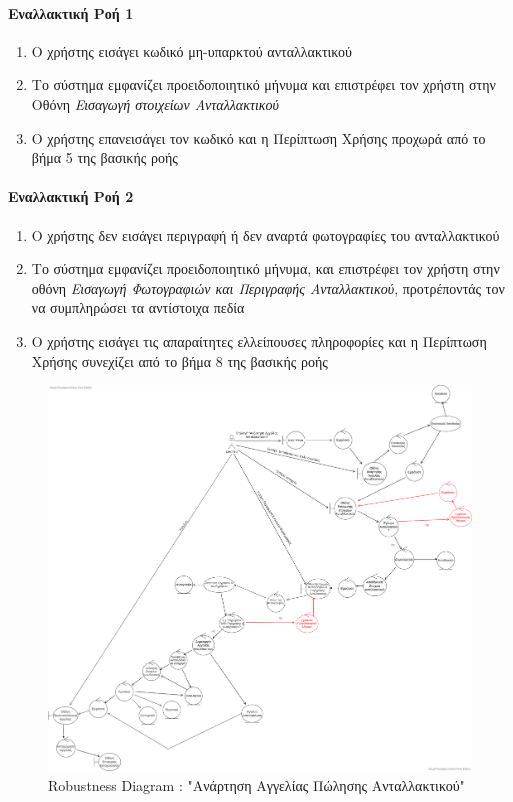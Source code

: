 \documentclass{../ol-softwaremanual}
\begin{document}
	
	\paragraph{Εναλλακτική Ροή 1}
	
	\begin{enumerate}
		\item Ο χρήστης εισάγει κωδικό μη-υπαρκτού ανταλλακτικού
		\item Το σύστημα εμφανίζει προειδοποιητικό μήνυμα και επιστρέφει τον χρήστη στην Οθόνη \textit{Εισαγωγή στοιχείων Ανταλλακτικού}
		\item Ο χρήστης επανεισάγει τον κωδικό και η Περίπτωση Χρήσης προχωρά από το βήμα 5 της βασικής ροής
	\end{enumerate}
	
	\paragraph{Εναλλακτική Ροή 2}
	
	\begin{enumerate}
		\item Ο χρήστης δεν εισάγει περιγραφή ή δεν αναρτά φωτογραφίες του ανταλλακτικού
		\item Το σύστημα εμφανίζει προειδοποιητικό μήνυμα, και επιστρέφει τον χρήστη στην οθόνη \textit{Εισαγωγή Φωτογραφιών και Περιγραφής Ανταλλακτικού}, προτρέποντάς τον να συμπληρώσει τα αντίστοιχα πεδία
		\item Ο χρήστης εισάγει τις απαραίτητες ελλείπουσες πληροφορίες και η Περίπτωση Χρήσης συνεχίζει από το βήμα 8 της βασικής ροής
	\end{enumerate}
	
	\begin{figure}[htbp!]
		\includegraphics[scale=0.255]{img/rob_spare_part_listing.png}
		\caption{\en Robustness Diagram : "\gr Ανάρτηση Αγγελίας Πώλησης Ανταλλακτικού\en"\gr}
	\end{figure}
	
\end{document}
